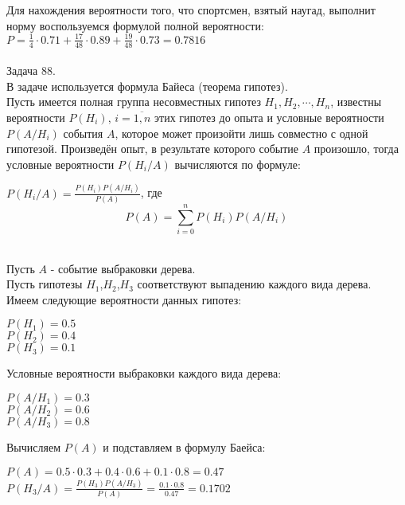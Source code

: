 Для нахождения вероятности того, что спортсмен, взятый наугад, выполнит норму воспользуемся формулой полной вероятности:\\
$P=\frac{1}{4}\cdot 0.71 + \frac{17}{48}\cdot 0.89 + \frac{19}{48}\cdot 0.73=0.7816$\\
\\Задача 88.\\
В задаче используется формула Байеса (теорема гипотез).\\
Пусть имеется полная группа несовместных гипотез $H_1,H_2,\cdots,H_n$, известны вероятности $P(H_i)$,  $i=\overline{1,n}$ этих гипотез до опыта и условные вероятности
$P(A/H_i)$  события $A$, которое может произойти лишь совместно с одной гипотезой.
Произведён опыт, в результате которого событие $A$ произошло, тогда условные вероятности $P(H_i/A)$ вычисляются по формуле:\\
\begin{center}
$P(H_i/A)=\frac{P(H_i)P(A/H_i)}{P(A)}$,
где $$P(A)=\sum_{i=0}^{n} P(H_i)P(A/H_i)$$\\
\end{center}
Пусть $A$ - событие выбраковки дерева.\\
Пусть гипотезы $H_1$,$H_2$,$H_3$ соответствуют выпадению каждого вида дерева.\\
Имеем следующие вероятности данных гипотез:\\
\begin{center}
$P(H_1)=0.5$\\
$P(H_2)=0.4$\\
$P(H_3)=0.1$\\
\end{center}
Условные вероятности выбраковки каждого вида дерева:\\
\begin{center}
$P(A/H_1)=0.3$\\
$P(A/H_2)=0.6$\\
$P(A/H_3)=0.8$\\
\end{center}
Вычисляем $P(A)$ и подставляем в формулу Баейса:\\
\begin{center}
$P(A)=0.5\cdot 0.3+0.4\cdot 0.6+0.1\cdot 0.8=0.47$\\
$P(H_3/A)=\frac{P(H_3)P(A/H_3)}{P(A)}=\frac{0.1\cdot 0.8}{0.47}=0.1702$\\
\end{center}
\newpage

